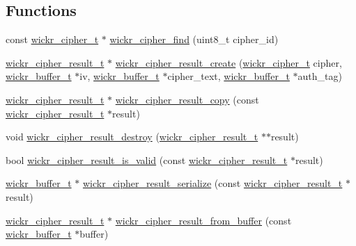 \subsection*{Functions}
\begin{DoxyCompactItemize}
\item 
const \mbox{\hyperlink{structwickr__cipher}{wickr\+\_\+cipher\+\_\+t}} $\ast$ \mbox{\hyperlink{group__wickr__cipher_ga2b7a8bc33e1fd5af61763398ea9a4013}{wickr\+\_\+cipher\+\_\+find}} (uint8\+\_\+t cipher\+\_\+id)
\item 
\mbox{\hyperlink{structwickr__cipher__result}{wickr\+\_\+cipher\+\_\+result\+\_\+t}} $\ast$ \mbox{\hyperlink{group__wickr__cipher_ga234b60967d0b3ef0088ca3ac30755dde}{wickr\+\_\+cipher\+\_\+result\+\_\+create}} (\mbox{\hyperlink{structwickr__cipher}{wickr\+\_\+cipher\+\_\+t}} cipher, \mbox{\hyperlink{structwickr__buffer}{wickr\+\_\+buffer\+\_\+t}} $\ast$iv, \mbox{\hyperlink{structwickr__buffer}{wickr\+\_\+buffer\+\_\+t}} $\ast$cipher\+\_\+text, \mbox{\hyperlink{structwickr__buffer}{wickr\+\_\+buffer\+\_\+t}} $\ast$auth\+\_\+tag)
\item 
\mbox{\hyperlink{structwickr__cipher__result}{wickr\+\_\+cipher\+\_\+result\+\_\+t}} $\ast$ \mbox{\hyperlink{group__wickr__cipher_gace82050fcc8b7932df9a9e8109a2fc1d}{wickr\+\_\+cipher\+\_\+result\+\_\+copy}} (const \mbox{\hyperlink{structwickr__cipher__result}{wickr\+\_\+cipher\+\_\+result\+\_\+t}} $\ast$result)
\item 
void \mbox{\hyperlink{group__wickr__cipher_gad5d22ca53abc4397d88040f0f8003021}{wickr\+\_\+cipher\+\_\+result\+\_\+destroy}} (\mbox{\hyperlink{structwickr__cipher__result}{wickr\+\_\+cipher\+\_\+result\+\_\+t}} $\ast$$\ast$result)
\item 
bool \mbox{\hyperlink{group__wickr__cipher_ga3f1b679c199987148952816b6fc4c009}{wickr\+\_\+cipher\+\_\+result\+\_\+is\+\_\+valid}} (const \mbox{\hyperlink{structwickr__cipher__result}{wickr\+\_\+cipher\+\_\+result\+\_\+t}} $\ast$result)
\item 
\mbox{\hyperlink{structwickr__buffer}{wickr\+\_\+buffer\+\_\+t}} $\ast$ \mbox{\hyperlink{group__wickr__cipher_gacda386115dc52f83a0518f8ac0dad6a2}{wickr\+\_\+cipher\+\_\+result\+\_\+serialize}} (const \mbox{\hyperlink{structwickr__cipher__result}{wickr\+\_\+cipher\+\_\+result\+\_\+t}} $\ast$result)
\item 
\mbox{\hyperlink{structwickr__cipher__result}{wickr\+\_\+cipher\+\_\+result\+\_\+t}} $\ast$ \mbox{\hyperlink{group__wickr__cipher_gad42314812c457855c3799632494c91a7}{wickr\+\_\+cipher\+\_\+result\+\_\+from\+\_\+buffer}} (const \mbox{\hyperlink{structwickr__buffer}{wickr\+\_\+buffer\+\_\+t}} $\ast$buffer)
$$
\end{DoxyCompactItemize}
